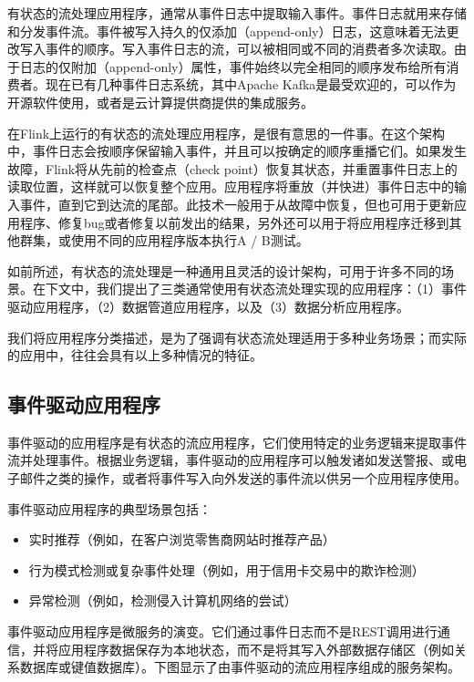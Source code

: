 \documentclass[cn,11pt,chinese]{elegantbook}
\providecommand{\tightlist}{%
  \setlength{\itemsep}{0pt}\setlength{\parskip}{0pt}}
\begin{document}
有状态的流处理应用程序，通常从事件日志中提取输入事件。事件日志就用来存储和分发事件流。事件被写入持久的仅添加（append-only）日志，这意味着无法更改写入事件的顺序。写入事件日志的流，可以被相同或不同的消费者多次读取。由于日志的仅附加（append-only）属性，事件始终以完全相同的顺序发布给所有消费者。现在已有几种事件日志系统，其中Apache
Kafka是最受欢迎的，可以作为开源软件使用，或者是云计算提供商提供的集成服务。

在Flink上运行的有状态的流处理应用程序，是很有意思的一件事。在这个架构中，事件日志会按顺序保留输入事件，并且可以按确定的顺序重播它们。如果发生故障，Flink将从先前的检查点（check
point）恢复其状态，并重置事件日志上的读取位置，这样就可以恢复整个应用。应用程序将重放（并快进）事件日志中的输入事件，直到它到达流的尾部。此技术一般用于从故障中恢复，但也可用于更新应用程序、修复bug或者修复以前发出的结果，另外还可以用于将应用程序迁移到其他群集，或使用不同的应用程序版本执行A
/ B测试。

如前所述，有状态的流处理是一种通用且灵活的设计架构，可用于许多不同的场景。在下文中，我们提出了三类通常使用有状态流处理实现的应用程序：（1）事件驱动应用程序，（2）数据管道应用程序，以及（3）数据分析应用程序。

我们将应用程序分类描述，是为了强调有状态流处理适用于多种业务场景；而实际的应用中，往往会具有以上多种情况的特征。

\hypertarget{ux4e8bux4ef6ux9a71ux52a8ux5e94ux7528ux7a0bux5e8f}{%
\subsection{事件驱动应用程序}\label{ux4e8bux4ef6ux9a71ux52a8ux5e94ux7528ux7a0bux5e8f}}

事件驱动的应用程序是有状态的流应用程序，它们使用特定的业务逻辑来提取事件流并处理事件。根据业务逻辑，事件驱动的应用程序可以触发诸如发送警报、或电子邮件之类的操作，或者将事件写入向外发送的事件流以供另一个应用程序使用。

事件驱动应用程序的典型场景包括：

\begin{itemize}
\tightlist
\item
  实时推荐（例如，在客户浏览零售商网站时推荐产品）
\item
  行为模式检测或复杂事件处理（例如，用于信用卡交易中的欺诈检测）
\item
  异常检测（例如，检测侵入计算机网络的尝试）
\end{itemize}

事件驱动应用程序是微服务的演变。它们通过事件日志而不是REST调用进行通信，并将应用程序数据保存为本地状态，而不是将其写入外部数据存储区（例如关系数据库或键值数据库）。下图显示了由事件驱动的流应用程序组成的服务架构。
\end{document}
